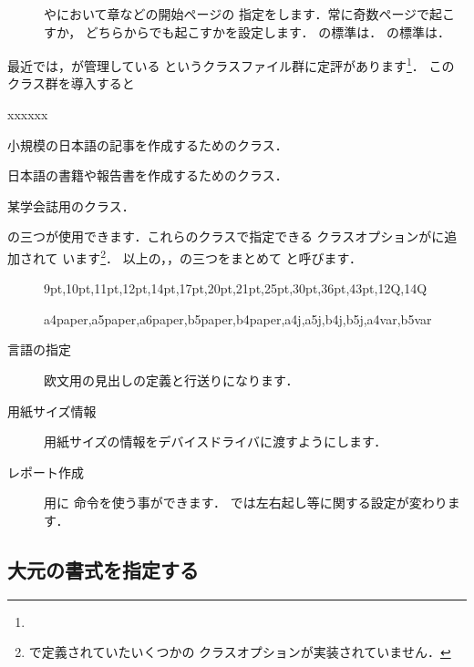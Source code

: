 \begin{description}
\item[]
やにおいて章などの開始ページの
指定をします．常に奇数ページで起こすか，
どちらからでも起こすかを設定します．
の標準は．
の標準は．
\end{description}


最近では，が管理している
というクラスファイル群に定評があります\footnote{\webJsclasses}．
このクラス群を導入すると
\begin{namelist}{xxxxxx}
\item[\Cls{jsarticle}]	小規模の日本語の記事を作成するためのクラス．
\item[\Cls{jsbook}]	日本語の書籍や報告書を作成するためのクラス．
\item[\Cls{jspf}]	某学会誌用のクラス．
\end{namelist}
の三つが使用できます．これらのクラスで指定できる
クラスオプションがに追加されて
います\footnote{で定義されていたいくつかの
クラスオプションが実装されていません．}．
以上の，，の三つをまとめて
と呼びます．

\begin{description}
\item[]{\Optionlist%
   {9pt,10pt,11pt,12pt,14pt,17pt,20pt,21pt,25pt,30pt,36pt,43pt,12Q,14Q}}
\item[]{\Optionlist%
   {a4paper,a5paper,a6paper,b5paper,b4paper,a4j,a5j,b4j,b5j,a4var,b5var}}
\item[言語の指定]{}
  欧文用の見出しの定義と行送りになります．
\item[用紙サイズ情報] {} 
  用紙サイズの情報をデバイスドライバに渡すようにします．
\item[レポート作成] {} 
  用に  命令を使う事ができます．
   では左右起し等に関する設定が変わります．
\end{description}





\subsection{大元の書式を指定する}

